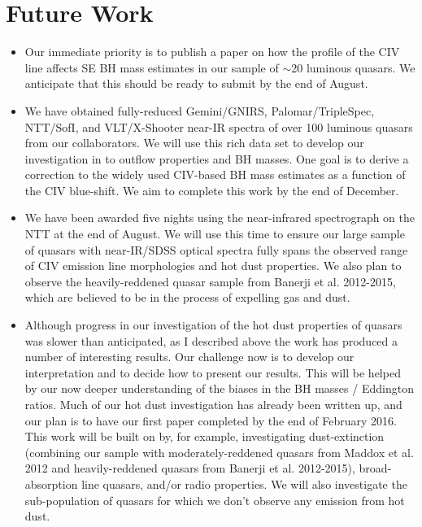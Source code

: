 \section{Future Work}

\begin{itemize}
\item Our immediate priority is to publish a paper on how the profile of the CIV line affects SE BH mass estimates in our sample of $\sim$20 luminous quasars. We anticipate that this should be ready to submit by the end of August. 
\item We have obtained fully-reduced Gemini/GNIRS, Palomar/TripleSpec, NTT/SofI, and VLT/X-Shooter near-IR spectra of over 100 luminous quasars from our collaborators. We will use this rich data set to develop our investigation in to outflow properties and BH masses. One goal is to derive a correction to the widely used CIV-based BH mass estimates as a function of the CIV blue-shift. We aim to complete this work by the end of December.  
\item We have been awarded five nights using the near-infrared spectrograph on the NTT at the end of August. We will use this time to ensure our large sample of quasars with near-IR/SDSS optical spectra fully spans the observed range of CIV emission line morphologies and hot dust properties. We also plan to observe the heavily-reddened quasar sample from Banerji et al. 2012-2015, which are believed to be in the process of expelling gas and dust.
\item Although progress in our investigation of the hot dust properties of quasars was slower than anticipated, as I described above the work has produced a number of interesting results. Our challenge now is to develop our interpretation and to decide how to present our results. This will be helped by our now deeper understanding of the biases in the BH masses / Eddington ratios. Much of our hot dust investigation has already been written up, and our plan is to have our first paper completed by the end of February 2016. This work will be built on by, for example, investigating dust-extinction (combining our sample with moderately-reddened quasars from Maddox et al. 2012 and heavily-reddened quasars from Banerji et al. 2012-2015), broad-absorption line quasars, and/or radio properties. We will also investigate the sub-population of quasars for which we don't observe any emission from hot dust. 
\end{itemize}